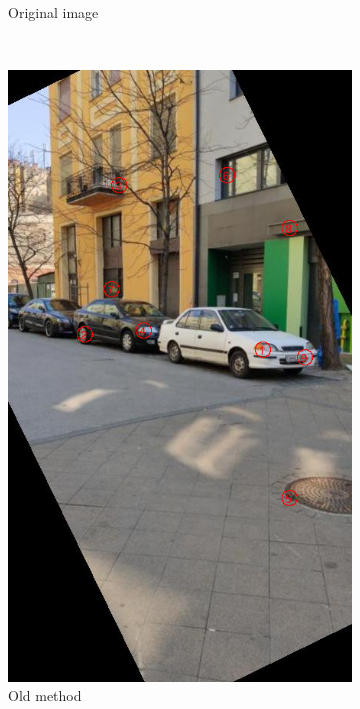 \begin{figure}[tbp]
\begin{subfigure}{0.68\textwidth}
	\caption{Original image}
    \end{subfigure}\\
    \begin{subfigure}{0.45\textwidth}
        \centering
    \includegraphics[width=\textwidth, trim=0 200 0 80, clip]{figures/templates/old.png}
	\caption{Old method}
    \end{subfigure}
    \begin{subfigure}{0.45\textwidth}
        \centering

\end{subfigure}
\end{figure}
